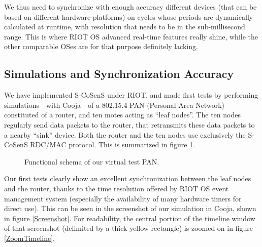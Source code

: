 \documentclass[a4paper,twoside]{article}
\begin{document}
We thus need to synchronize with enough accuracy different devices (that
can be based on different hardware platforms) on cycles whose periods
are dynamically calculated at runtime, with resolution that needs to be
in the sub-millisecond range. This is where RIOT OS advanced real-time
features really shine, while the other comparable OSes are
for that purpose definitely lacking.

\subsection{Simulations and Synchronization Accuracy}

We have implemented S-CoSenS under RIOT, and made first tests by performing
simulations---with Cooja---of a 802.15.4 PAN (Personal Area Network)
constituted of a router, and ten motes acting as ``leaf nodes''.
The ten nodes regularly send data packets to the router, that retransmits
these data packets to a nearby ``sink'' device. Both the router and the ten
nodes use exclusively the S-CoSenS RDC/MAC protocol. This is summarized
in figure \ref{FigPANtest}.

\begin{figure}[!h]
\centering
{}
\caption{Functional schema of our virtual test PAN.}
\label{FigPANtest}
\end{figure}

Our first tests clearly show an excellent synchronization between the
leaf nodes and the router, thanks to the time resolution offered by RIOT OS
event management system (especially the availability of many hardware
timers for direct use). This can be seen in the screenshot of our
simulation in Cooja, shown in figure \ref{Screenshot}. For readability,
the central portion of the timeline window of that screenshot (delimited
by a thick yellow rectangle) is zoomed on in figure \ref{ZoomTimeline}.
\end{document}
